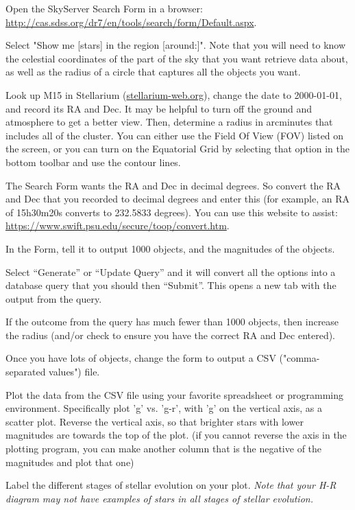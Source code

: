 \begin{steps}
	\item Open the SkyServer Search Form in a browser: \url{http://cas.sdss.org/dr7/en/tools/search/form/Default.aspx}.
	
	\item Select "Show me [stars] in the region [around:]". Note that you will need to know the celestial coordinates of the part of the sky that you want retrieve data about, as well as the radius of a circle that captures all the objects you want.
	
	\item Look up M15 in Stellarium (\url{stellarium-web.org}), change the date to 2000-01-01, and record its RA and Dec. It may be helpful to turn off the ground and atmosphere to get a better view. Then, determine a radius in arcminutes that includes all of the cluster. You can either use the Field Of View (FOV) listed on the screen, or you can turn on the Equatorial Grid by selecting that option in the bottom toolbar and use the contour lines.
	
	\item The Search Form wants the RA and Dec in decimal degrees. So convert the RA and Dec that you recorded to decimal degrees and enter this (for example, an RA of 15h30m20s converts to 232.5833 degrees). You can use this website to assist: \url{https://www.swift.psu.edu/secure/toop/convert.htm}.
	
	\item In the Form, tell it to output 1000 objects, and the magnitudes of the objects.
	
	\item Select ``Generate'' or ``Update Query'' and it will convert all the options into a database query that you should then ``Submit''. This opens a new tab with the output from the query.
	
	\item If the outcome from the query has much fewer than 1000 objects, then increase the radius (and/or check to ensure you have the correct RA and Dec entered).
	
	\item Once you have lots of objects, change the form to output a CSV ("comma-separated values") file.
	
	\item Plot the data from the CSV file using your favorite spreadsheet or programming environment. Specifically plot 'g' vs. 'g-r', with 'g' on the vertical axis, as a scatter plot. Reverse the vertical axis, so that brighter stars with lower magnitudes are towards the top of the plot. (if you cannot reverse the axis in the plotting program, you can make another column that is the negative of the magnitudes and plot that one)

	\item Label the different stages of stellar evolution on your plot. \textit{Note that your H-R diagram may not have examples of stars in all stages of stellar evolution.}
\end{steps}

